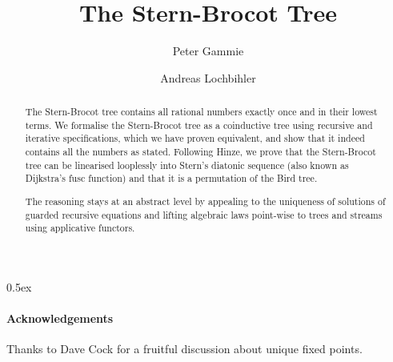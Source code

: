 \documentclass[11pt,a4paper]{article}
\begin{document}
\title{The Stern-Brocot Tree}
\author{Peter Gammie \and Andreas Lochbihler}
\maketitle

\begin{abstract}
  The Stern-Brocot tree contains all rational numbers exactly once and in their lowest terms.
  We formalise the Stern-Brocot tree as a coinductive tree using recursive and iterative specifications,
  which we have proven equivalent, and show that it indeed contains all the numbers as stated.
  Following Hinze, we prove that the Stern-Brocot tree can be linearised looplessly into Stern's
  diatonic sequence (also known as Dijkstra's fusc function) and that it is a permutation of the
  Bird tree.

  The reasoning stays at an abstract level by appealing to the uniqueness of solutions of
  guarded recursive equations and lifting algebraic laws point-wise to trees and streams using
  applicative functors.
\end{abstract}

\tableofcontents

\parindent 0pt\parskip 0.5ex

\paragraph{Acknowledgements}
Thanks to Dave Cock for a fruitful discussion about unique fixed points.





\end{document}
